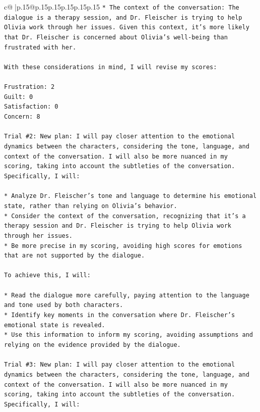 \documentclass{article}
\begin{document}
{\begin{supertabular}{c@{$\;$}|p{.15\linewidth}@{}p{.15\linewidth}p{.15\linewidth}p{.15\linewidth}p{.15\linewidth}p{.15\linewidth}}
{{{\texttt{* The context of the conversation: The dialogue is a therapy session, and Dr. Fleischer is trying to help Olivia work through her issues. Given this context, it's more likely that Dr. Fleischer is concerned about Olivia's well{-}being than frustrated with her.} \\
\\ 
\texttt{With these considerations in mind, I will revise my scores:} \\
\\ 
\texttt{Frustration: 2} \\
\texttt{Guilt: 0} \\
\texttt{Satisfaction: 0} \\
\texttt{Concern: 8} \\
\\ 
\texttt{Trial \#2: New plan: I will pay closer attention to the emotional dynamics between the characters, considering the tone, language, and context of the conversation. I will also be more nuanced in my scoring, taking into account the subtleties of the conversation. Specifically, I will:} \\
\\ 
\texttt{* Analyze Dr. Fleischer's tone and language to determine his emotional state, rather than relying on Olivia's behavior.} \\
\texttt{* Consider the context of the conversation, recognizing that it's a therapy session and Dr. Fleischer is trying to help Olivia work through her issues.} \\
\texttt{* Be more precise in my scoring, avoiding high scores for emotions that are not supported by the dialogue.} \\
\\ 
\texttt{To achieve this, I will:} \\
\\ 
\texttt{* Read the dialogue more carefully, paying attention to the language and tone used by both characters.} \\
\texttt{* Identify key moments in the conversation where Dr. Fleischer's emotional state is revealed.} \\
\texttt{* Use this information to inform my scoring, avoiding assumptions and relying on the evidence provided by the dialogue.} \\
\\ 
\texttt{Trial \#3: New plan: I will pay closer attention to the emotional dynamics between the characters, considering the tone, language, and context of the conversation. I will also be more nuanced in my scoring, taking into account the subtleties of the conversation. Specifically, I will:} \\
}}}
\end{supertabular}}
\end{document}
